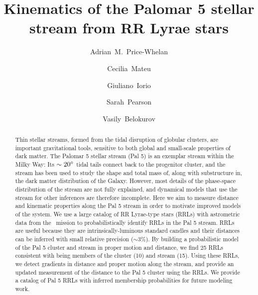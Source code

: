 \documentclass[twocolumn]{aastex63}
\begin{document}
\title{Kinematics of the Palomar 5 stellar stream from RR Lyrae stars}


\author[0000-0003-0872-7098]{Adrian~M.~Price-Whelan}

\author[0000-0002-6330-2394]{Cecilia~Mateu}


\author{Giuliano~Iorio}

\author[0000-0003-0256-5446]{Sarah~Pearson}

\author{Vasily~Belokurov}


\begin{abstract}
Thin stellar streams, formed from the tidal disruption of globular clusters, are important gravitational tools, sensitive to both global and small-scale properties of dark matter.
The Palomar 5 stellar stream (Pal 5) is an exemplar stream within the Milky Way: Its $\sim 20\mbox{$^\circ$}$ tidal tails connect back to the progenitor cluster, and the stream has been used to study the shape and total mass of, along with substructure in, the dark matter distribution of the Galaxy.
However, most details of the phase-space distribution of the stream are not fully explained, and dynamical models that use the stream for other inferences are therefore incomplete.
Here we aim to measure distance and kinematic properties along the Pal 5 stream in order to motivate improved models of the system. %
We use a large catalog of RR Lyrae-type stars (RRLs) with astrometric data from the \Gaia\ mission to probabilistically identify RRLs in the Pal 5 stream.
RRLs are useful because they are intrinsically-luminous standard candles and their distances can be inferred with small relative precision ($\sim3\%$).
By building a probabilistic model of the Pal 5 cluster and stream in proper motion and distance, we find 25 RRLs consistent with being members of the cluster (10) and stream (15).
Using these RRLs, we detect gradients in distance and proper motion along the stream, and provide an updated measurement of the distance to the Pal 5 cluster using the RRLs.
We provide a catalog of Pal 5 RRLs with inferred membership probabilities for future modeling work.
\end{abstract}
\end{document}
